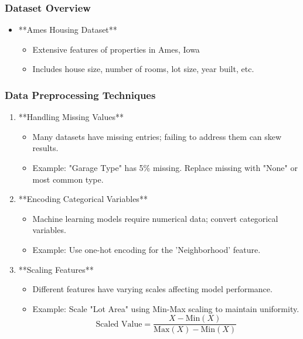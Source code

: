 \documentclass[aspectratio=169]{beamer}
\begin{document}
\begin{frame}[fragile]
    \frametitle{Dataset Overview}
    \begin{itemize}
        \item **Ames Housing Dataset**
        \begin{itemize}
            \item Extensive features of properties in Ames, Iowa
            \item Includes house size, number of rooms, lot size, year built, etc.
        \end{itemize}
    \end{itemize}
\end{frame}

\begin{frame}[fragile]
    \frametitle{Data Preprocessing Techniques}
    \begin{enumerate}
        \item **Handling Missing Values**
            \begin{itemize}
                \item Many datasets have missing entries; failing to address them can skew results.
                \item Example: "Garage Type" has 5\% missing. Replace missing with "None" or most common type.
            \end{itemize}
        
        \item **Encoding Categorical Variables**
            \begin{itemize}
                \item Machine learning models require numerical data; convert categorical variables.
                \item Example: Use one-hot encoding for the 'Neighborhood' feature.
            \end{itemize}
        
        \item **Scaling Features**
            \begin{itemize}
                \item Different features have varying scales affecting model performance.
                \item Example: Scale "Lot Area" using Min-Max scaling to maintain uniformity.
                \begin{equation}
                    \text{Scaled Value} = \frac{X - \text{Min}(X)}{\text{Max}(X) - \text{Min}(X)} 
                \end{equation}
            \end{itemize}
        

\end{enumerate}
\end{frame}
\end{document}
